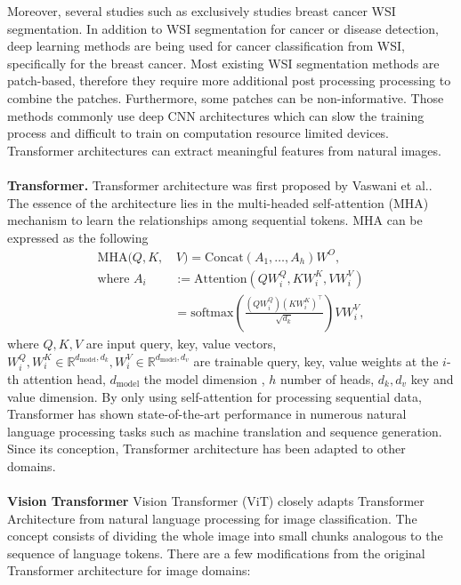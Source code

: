 \documentclass[review]{cvpr}
\begin{document}
Moreover, several studies such as \cite{Guofast2020} exclusively studies breast cancer WSI segmentation. In addition to WSI segmentation for cancer or disease detection, deep learning methods are being used for cancer classification from WSI\cite{XU2014591}, specifically for the  breast cancer. Most existing WSI segmentation methods are patch-based, therefore they require more additional post processing processing to combine the patches. Furthermore, some patches can be non-informative. Those methods commonly use deep CNN architectures which can slow the training process and difficult to train on computation resource limited devices. Transformer architectures can extract meaningful features from natural images. \\
\\
\textbf{Transformer.} Transformer architecture was first proposed by Vaswani et al.\cite{vaswani2017attention}. The essence of the architecture lies in the multi-headed self-attention (MHA) mechanism to learn the relationships among sequential tokens. MHA can be expressed as the following
\begin{equation}
\begin{split}
    \text{MHA}(Q, K,&\, V) =  \text{Concat}(A_1, \dots, A_h)W^O, \\[3mm]
    \text{where } A_i & := \text{Attention}(QW_i^Q, KW_i^K, VW_i^V) \\
        & = \text{softmax} \left( \frac{(QW_i^Q)(KW_i^K)^\top}{\sqrt{d_k}} \right) VW_i^V,
    \label{attention}
\end{split}
\end{equation}
where $Q, K, V$ are input query, key, value vectors, $W_i^Q, W_i^K \in \mathbb{R}^{d_{\text{model}}, d_k}, W_i^V \in \mathbb{R}^{d_{\text{model}}, d_v}$ are trainable query, key, value weights at the $i$-th attention head, $d_{\text{model}}$ the model dimension , $h$ number of heads, $d_k, d_v$ key and value dimension. By only using self-attention for processing sequential data, Transformer has shown state-of-the-art performance in numerous natural language processing tasks such as machine translation and sequence generation. Since its conception, Transformer architecture has been adapted to other domains.\\
\\
\textbf{Vision Transformer} Vision Transformer (ViT)\cite{dosovitskiy2020image} closely adapts Transformer Architecture from natural language processing for image classification. The concept consists of dividing the whole image into small chunks analogous to the sequence of language tokens. There are a few modifications from the original Transformer architecture for image domains:
\end{document}
